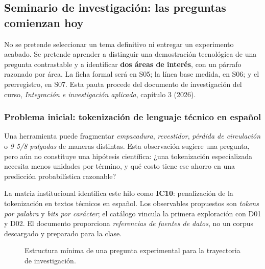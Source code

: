 \subsection{Seminario de investigación: las preguntas comienzan hoy}

\begin{investigacion}
No se pretende seleccionar un tema definitivo ni entregar un experimento acabado.
Se pretende aprender a distinguir una demostración tecnológica de una pregunta
contrastable y a identificar \textbf{dos áreas de interés}, con un párrafo razonado
por área. La ficha formal será en S05; la línea base medida, en S06; y el
prerregistro, en S07. Esta pauta procede del documento de investigación del curso,
\emph{Integración e investigación aplicada}, capítulo 3 (2026).
\end{investigacion}

\subsubsection*{Problema inicial: tokenización de lenguaje técnico en español}

Una herramienta puede fragmentar \emph{empacadura}, \emph{revestidor},
\emph{pérdida de circulación} o \emph{9 5/8 pulgadas} de maneras distintas.
Esta observación sugiere una pregunta, pero aún no constituye una hipótesis
científica: ¿una tokenización especializada necesita menos unidades por término,
y qué costo tiene ese ahorro en una predicción probabilística razonable?

La matriz institucional identifica este hilo como \textbf{IC10}: penalización de
la tokenización en textos técnicos en español. Los observables propuestos son
\emph{tokens por palabra} y \emph{bits por carácter}; el catálogo vincula la
primera exploración con D01 y D02. El documento proporciona \emph{referencias de
fuentes de datos}, no un corpus descargado y preparado para la clase.

\begin{figure}[H]\centering
{}
\caption{Estructura mínima de una pregunta experimental para la trayectoria de investigación.}
\end{figure}


